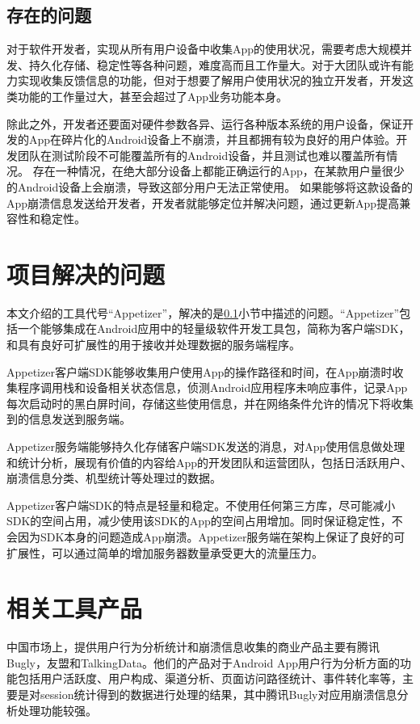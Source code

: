 \subsection{存在的问题}
\label{subsec:exist_problem}

对于软件开发者，实现从所有用户设备中收集App的使用状况，需要考虑大规模并发、持久化存储、稳定性等各种问题，难度高而且工作量大。对于大团队或许有能力实现收集反馈信息的功能，但对于想要了解用户使用状况的独立开发者，开发这类功能的工作量过大，甚至会超过了App业务功能本身。

除此之外，开发者还要面对硬件参数各异、运行各种版本系统的用户设备，保证开发的App在碎片化的Android设备上不崩溃，并且都拥有较为良好的用户体验。开发团队在测试阶段不可能覆盖所有的Android设备，并且测试也难以覆盖所有情况。
存在一种情况，在绝大部分设备上都能正确运行的App，在某款用户量很少的Android设备上会崩溃，导致这部分用户无法正常使用。
如果能够将这款设备的App崩溃信息发送给开发者，开发者就能够定位并解决问题，通过更新App提高兼容性和稳定性。

\section{项目解决的问题}
\label{sec:solve_problem}

本文介绍的工具代号“Appetizer”，解决的是\ref{subsec:exist_problem}小节中描述的问题。“Appetizer”包括一个能够集成在Android应用中的轻量级软件开发工具包，简称为客户端SDK，和具有良好可扩展性的用于接收并处理数据的服务端程序。

Appetizer客户端SDK能够收集用户使用App的操作路径和时间，在App崩溃时收集程序调用栈和设备相关状态信息，侦测Android应用程序未响应事件，记录App每次启动时的黑白屏时间，存储这些使用信息，并在网络条件允许的情况下将收集到的信息发送到服务端。

Appetizer服务端能够持久化存储客户端SDK发送的消息，对App使用信息做处理和统计分析，展现有价值的内容给App的开发团队和运营团队，包括日活跃用户、崩溃信息分类、机型统计等处理过的数据。

Appetizer客户端SDK的特点是轻量和稳定。不使用任何第三方库，尽可能减小SDK的空间占用，减少使用该SDK的App的空间占用增加。同时保证稳定性，不会因为SDK本身的问题造成App崩溃。Appetizer服务端在架构上保证了良好的可扩展性，可以通过简单的增加服务器数量承受更大的流量压力。

\section{相关工具产品}
\label{sec:related_work}

中国市场上，提供用户行为分析统计和崩溃信息收集的商业产品主要有腾讯Bugly\parencite{bugly}，友盟\parencite{umeng}和TalkingData\parencite{talkingdata}。他们的产品对于Android App用户行为分析方面的功能包括用户活跃度、用户构成、渠道分析、页面访问路径统计、事件转化率等，主要是对session统计得到的数据进行处理的结果，其中腾讯Bugly对应用崩溃信息分析处理功能较强。

